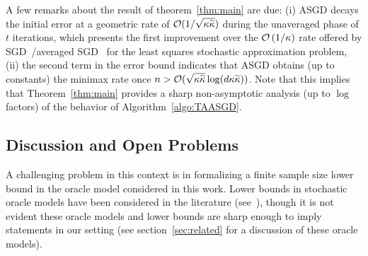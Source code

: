 A few remarks about the result of theorem~\ref{thm:main} are due: (i) ASGD decays the initial error at a geometric rate of $\mathcal{O}(1/\sqrt{{\kappa}\widetilde{\kappa}})$ during the unaveraged phase of $t$ iterations, which presents the first improvement over the $\mathcal{O}\left(1/{\kappa}\right)$ rate offered by SGD~\citep{RobbinsM51}/averaged SGD~\citep{PolyakJ92,JainKKNS16} for the least squares stochastic approximation problem, (ii) the second term in the error bound indicates that ASGD obtains (up to constants) the minimax rate once $n>\mathcal{O}(\sqrt{{\kappa}\widetilde{\kappa}}\log(d{\kappa}\widetilde{\kappa}))$. Note that this implies that Theorem~\ref{thm:main} provides a sharp non-asymptotic analysis (up to $\log$ factors) of the behavior of Algorithm~\ref{algo:TAASGD}.\iffalse (iii) as long as the number of burn-in iterations $t$ and the tail-averaged iterations $n-t$ exceed $\mathcal{O}\left(\sqrt{\cnH\cnS}\cdot\log(d\cnH\cnS) \cdot \log \frac{P(\xt[0])-P(\xs)}{(\sigma^2 d)/n}\right)$, algorithm~\ref{algo:TAASGD} achieves (up to constants) the statistically optimal estimation rates, i.e.:
\begin{align*}
&\E{P(\bar{\x}_{t,n})}-P(\xs) \leq C\ \frac{\sigma^2d}{n},
\end{align*}
where $C$ is a universal constant. This implies that the result in theorem~\ref{thm:main} presents a sharp non-asymptotic analysis (up to $\log$ factors) of the behavior of ASGD.\fi%



\subsection{Discussion and Open Problems}\label{sec:resultDiscussion}

A challenging problem in this context is in formalizing a finite sample size lower bound in the oracle model considered in this work.  Lower bounds in stochastic oracle models have been considered in the literature (see~\cite{NemirovskyY83,RaginskyR11,AgarwalBRW12}), though it is not evident these oracle models and lower bounds are sharp enough to imply statements in our setting (see section~\ref{sec:related} for a discussion of these oracle models).

